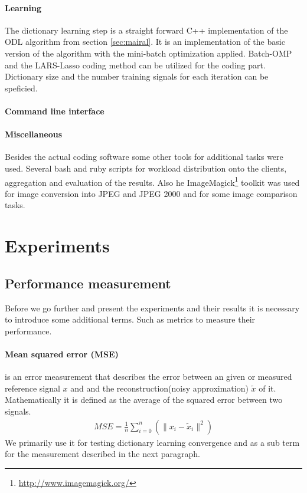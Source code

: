 \paragraph{Learning}
The dictionary learning step is a straight forward C++ implementation of the
ODL algorithm from section \ref{sec:mairal}. It is an
implementation of the
basic version of the algorithm with the mini-batch optimization applied.
Batch-OMP and the LARS-Lasso coding method can be utilized for the coding part.
Dictionary size and the number training signals for each iteration can be
speficied.

\paragraph{Command line interface}
%

\paragraph{Miscellaneous}
Besides the actual coding software some other tools for
additional tasks were used. Several bash and ruby scripts for workload
distribution onto the clients, aggregation and evaluation of the results.
Also he ImageMagick\footnote{\url{http://www.imagemagick.org/}} toolkit was used
for image conversion into JPEG and JPEG 2000 and for some image comparison
tasks.


\section{Experiments}

\subsection{Performance measurement}
Before we go further and present the experiments and their results  it is
necessary to introduce some additional terms. Such as metrics to measure
their performance.

\paragraph{Mean squared error (MSE)} is an error measurement that
describes the error between an given or measured reference signal $x$
and and the reconstruction(noisy approximation) $\tilde{x}$ of it.
Mathematically it is defined as the average of the squared error between two
signals.
\begin{align}
 MSE = \frac{1}{n} \sum_{i=0}^{n} \left( {\lVert x_i -
\tilde{x}_i\rVert^{2}}\right)
\end{align}
We primarily use it for testing dictionary learning convergence and as a
sub term for the measurement described in the next paragraph.

